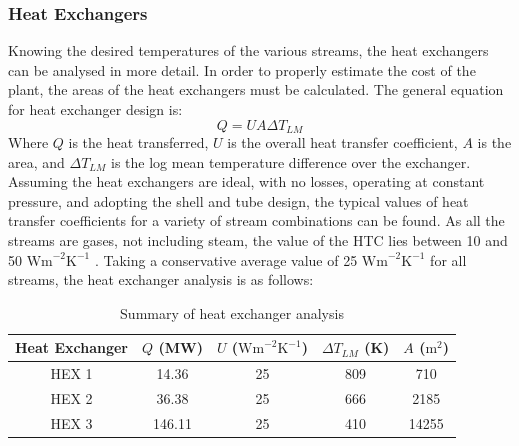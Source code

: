\subsubsection{Heat Exchangers}
    
    Knowing the desired temperatures of the various streams, the heat exchangers can be analysed in more detail. In order to properly estimate the cost of the plant, the areas of the heat exchangers must be calculated. The general equation for heat exchanger design is:
\begin{equation}
Q=UA\Delta T_{LM}						
\end{equation}
Where $Q$ is the heat transferred, $U$ is the overall heat transfer coefficient, $A$ is the area, and $\Delta T_{LM}$ is the log mean temperature difference over the exchanger. Assuming the heat exchangers are ideal, with no losses, operating at constant pressure, and adopting the shell and tube design, the typical values of heat transfer coefficients for a variety of stream combinations can be found. As all the streams are gases, not including steam, the value of the HTC lies between 10 and 50 $\text{Wm}^{-2} \text{K}^{-1}$ \cite{LM18}. Taking a conservative average value of 25 $\text{Wm}^{-2}\text{K}^{-1}$ for all streams, the heat exchanger analysis is as follows:


\begin{table}[h!]
\centering
\caption{Summary of heat exchanger analysis}
\label{my-label}
\begin{tabular}{|c|c|c|c|c|}
\hline
\textbf{Heat Exchanger} & \textbf{$Q$ (MW)} & \textbf{$U$ ($\text{Wm}^{-2} \text{K}^{-1}$)} & \textbf{$\Delta T_{LM}$ (K)} & \textbf{$A$ ($\text{m}^{2}$)} \\ \hline
HEX 1                   & 14.36           & 25                   & 809                     & 710             \\ \hline
HEX 2                   & 36.38           & 25                   & 666                     & 2185            \\ \hline
HEX 3                   & 146.11          & 25                   & 410                     & 14255           \\ \hline
\end{tabular}
\end{table}



